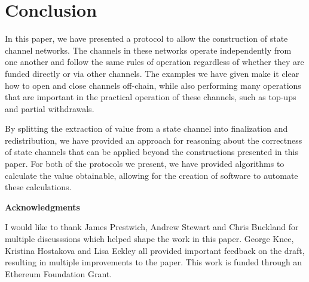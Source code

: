 \section{Conclusion}

In this paper, we have presented a protocol to allow the construction of state channel networks.
The channels in these networks operate independently from one another and follow the same rules of operation regardless of whether they are funded directly or via other channels.
The examples we have given make it clear how to open and close channels off-chain, while also performing many operations that are important in the practical operation of these channels, such as top-ups and partial withdrawals.

By splitting the extraction of value from a state channel into finalization and redistribution, we have provided an approach for reasoning about the correctness of state channels that can be applied beyond the constructions presented in this paper.
For both of the protocols we present, we have provided algorithms to calculate the value obtainable, allowing for the creation of software to automate these calculations.



\textbf{Acknowledgments}

I would like to thank James Prestwich, Andrew Stewart and Chris Buckland for multiple discusssions which helped shape the work in this paper. 
George Knee, Kristina Hostakova and Lisa Eckley all provided important feedback on the draft, resulting in multiple improvements to the paper.
This work is funded through an Ethereum Foundation Grant.
